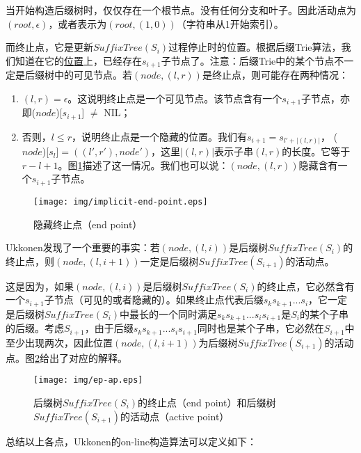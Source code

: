 \documentclass{ctexart}
\begin{document}
当开始构造后缀树时，仅仅存在一个根节点。没有任何分支和叶子。因此活动点为$(root, \epsilon)$，或者表示为$(root, (1, 0))$（字符串从1开始索引）。

而终止点，它是更新$SuffixTree(S_i)$过程停止时的位置。根据后缀Trie算法，我们知道在它的\underline{位置}上，已经存在$s_{i+1}$子节点了。注意：后缀Trie中的某个节点不一定是后缀树中的可见节点。若$(node, (l, r))$是终止点，则可能存在两种情况：

\begin{enumerate}
\item $(l, r)=\epsilon$。这说明终止点是一个可见节点。该节点含有一个$s_{i+1}$子节点，亦即($node$)[$s_{i+1}$] $\neq$ NIL；
\item 否则，$l \leq r$，说明终止点是一个隐藏的位置。我们有$s_{i+1}=s_{l'+|(l, r)|}$，
($node$)[$s_l$]$=((l', r'), node')$，这里$|(l, r)|$表示子串$(l, r)$的长度。它等于$r-l+1$。图\ref{fig:implicit-end-point}描述了这一情况。我们也可以说：$(node, (l, r))$隐藏含有一个$s_{i+1}$子节点。
\end{enumerate}

\begin{figure}[htbp]
  \centering
  \texttt{[image: img/implicit-end-point.eps]}
  \caption{隐藏终止点（end point）}
  \label{fig:implicit-end-point}
\end{figure}

Ukkonen发现了一个重要的事实：若$(node, (l, i))$是后缀树$SuffixTree(S_i)$的终止点，则$(node, (l, i+1))$一定是后缀树$SuffixTree(S_{i+1})$的活动点。

这是因为，如果$(node, (l, i))$是后缀树$SuffixTree(S_i)$的终止点，它必然含有一个$s_{i+1}$子节点（可见的或者隐藏的）。如果终止点代表后缀$s_ks_{k+1}...s_i$，它一定是后缀树$SuffixTree(S_i)$中最长的一个同时满足$s_ks_{k+1}...s_is_{i+1}$是$S_i$的某个子串的后缀。考虑$S_{i+1}$，由于后缀$s_ks_{k+1}...s_is_{i+1}$同时也是某个子串，它必然在$S_{i+1}$中至少出现两次，因此位置$(node, (l, i+1))$为后缀树$SuffixTree(S_{i+1})$的活动点。图\ref{fig:ep-ap}给出了对应的解释。

\begin{figure}[htbp]
  \centering
  \texttt{[image: img/ep-ap.eps]}
  \caption{后缀树$SuffixTree(S_i)$的终止点（end point）和后缀树$SuffixTree(S_{i+1})$的活动点（active point）}
  \label{fig:ep-ap}
\end{figure}

总结以上各点，Ukkonen的on-line构造算法可以定义如下：
\end{document}
